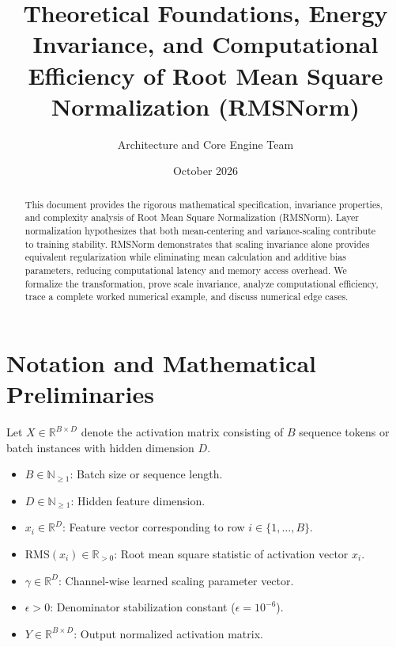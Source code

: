 \documentclass[11pt,a4paper]{article}
\title{\textbf{Theoretical Foundations, Energy Invariance, and Computational Efficiency of Root Mean Square Normalization (RMSNorm)}}
\author{Architecture and Core Engine Team}
\date{October 2026}
\theoremstyle{definition}
\begin{document}
\maketitle

\begin{abstract}
This document provides the rigorous mathematical specification, invariance properties, and complexity analysis of Root Mean Square Normalization (RMSNorm). Layer normalization hypothesizes that both mean-centering and variance-scaling contribute to training stability. RMSNorm demonstrates that scaling invariance alone provides equivalent regularization while eliminating mean calculation and additive bias parameters, reducing computational latency and memory access overhead. We formalize the transformation, prove scale invariance, analyze computational efficiency, trace a complete worked numerical example, and discuss numerical edge cases.
\end{abstract}

\section{Notation and Mathematical Preliminaries}

Let $X \in \mathbb{R}^{B \times D}$ denote the activation matrix consisting of $B$ sequence tokens or batch instances with hidden dimension $D$.

\begin{itemize}
    \item $B \in \mathbb{N}_{\ge 1}$: Batch size or sequence length.
    \item $D \in \mathbb{N}_{\ge 1}$: Hidden feature dimension.
    \item $x_i \in \mathbb{R}^D$: Feature vector corresponding to row $i \in \{1, \dots, B\}$.
    \item $\text{RMS}(x_i) \in \mathbb{R}_{> 0}$: Root mean square statistic of activation vector $x_i$.
    \item $\gamma \in \mathbb{R}^D$: Channel-wise learned scaling parameter vector.
    \item $\epsilon > 0$: Denominator stabilization constant ($\epsilon = 10^{-6}$).
    \item $Y \in \mathbb{R}^{B \times D}$: Output normalized activation matrix.
\end{itemize}
\end{document}
